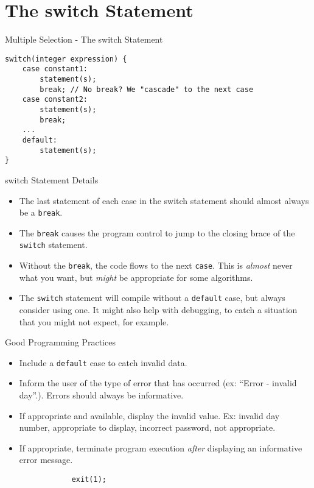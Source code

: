 \documentclass[graphics]{beamer}
\begin{document}
\section{The switch Statement}
\begin{frame}[fragile]{Multiple Selection - The switch Statement}
    \begin{verbatim}
switch(integer expression) {
    case constant1:
        statement(s);
        break; // No break? We "cascade" to the next case
    case constant2:
        statement(s);
        break;
    ...
    default:
        statement(s);
}
    \end{verbatim}
\end{frame}

\begin{frame}{switch Statement Details}
    \begin{itemize}
        \item The last statement of each case in the switch statement should almost always be a \texttt{break}.
        \item The \texttt{break} causes the program control to jump to the closing brace of the \texttt{switch} statement.
        \item Without the \texttt{break}, the code flows to the next \texttt{case}. This is \textit{almost} never what you want, but \textit{might} be appropriate for some algorithms.
        \item The \texttt{switch} statement will compile without a \texttt{default} case, but always consider using one. It might also help with debugging, to catch a situation that you might not expect, for example.
    \end{itemize}
\end{frame}

\begin{frame}[fragile]{Good Programming Practices}
    \begin{itemize}
        \item Include a \texttt{default} case to catch invalid data.
        \item Inform the user of the type of error that has occurred (ex: ``Error - invalid day''.). Errors should always be informative.
        \item If appropriate and available, display the invalid value. Ex: invalid day number, appropriate to display, incorrect password, not appropriate.
        \item If appropriate, terminate program execution \textit{after} displaying an informative error message.\
        \begin{verbatim}
            exit(1);
        \end{verbatim}
    \end{itemize}
\end{frame}
\end{document}
